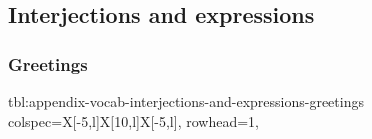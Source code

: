 \documentclass[../nihongo-gakushuu-kyouzai.tex]{subfiles}
\begin{document}
\appendix
\setcounter{section}{2}
\setcounter{subsection}{0}

\subsection{Interjections and expressions}

\subsubsection{Greetings}
{tbl:appendix-vocab-interjections-and-expressions-greetings}  %
{}  %
{
    colspec={X[-5,l]X[10,l]X[-5,l]},
    rowhead=1,
}  %
\end{document}
